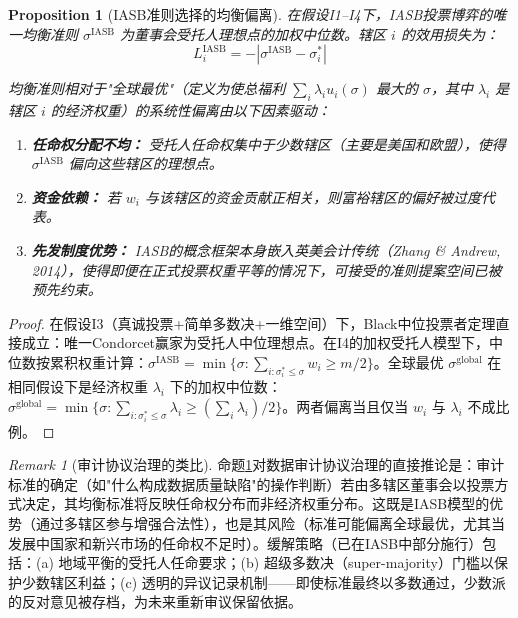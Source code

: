\documentclass[12pt,a4paper]{ctexart}
\newtheorem{proposition}[theorem]{Proposition}
\theoremstyle{definition}
\theoremstyle{remark}
\newtheorem{remark}{Remark}[section]
\begin{document}
\begin{proposition}[IASB准则选择的均衡偏离]
\label{prop:iasb-bias}
在假设I1--I4下，IASB投票博弈的唯一均衡准则 $\sigma^{\text{IASB}}$ 为董事会受托人理想点的加权中位数。辖区 $i$ 的效用损失为：
\begin{equation}
L_i^{\text{IASB}} = -|\sigma^{\text{IASB}} - \sigma_i^*|
\end{equation}

均衡准则相对于"全球最优"（定义为使总福利 $\sum_i \lambda_i u_i(\sigma)$ 最大的 $\sigma$，其中 $\lambda_i$ 是辖区 $i$ 的经济权重）的系统性偏离由以下因素驱动：
\begin{enumerate}[label=(\roman*)]
\item \textbf{任命权分配不均：} 受托人任命权集中于少数辖区（主要是美国和欧盟），使得 $\sigma^{\text{IASB}}$ 偏向这些辖区的理想点。
\item \textbf{资金依赖：} 若 $w_i$ 与该辖区的资金贡献正相关，则富裕辖区的偏好被过度代表。
\item \textbf{先发制度优势：} IASB的概念框架本身嵌入英美会计传统（Zhang \& Andrew, 2014），使得即便在正式投票权重平等的情况下，可接受的准则提案空间已被预先约束。
\end{enumerate}
\end{proposition}

\begin{proof}
在假设I3（真诚投票+简单多数决+一维空间）下，Black中位投票者定理直接成立：唯一Condorcet赢家为受托人中位理想点。在I4的加权受托人模型下，中位数按累积权重计算：$\sigma^{\text{IASB}} = \min\{\sigma : \sum_{i: \sigma_i^* \leq \sigma} w_i \geq m/2\}$。全球最优 $\sigma^{\text{global}}$ 在相同假设下是经济权重 $\lambda_i$ 下的加权中位数：$\sigma^{\text{global}} = \min\{\sigma : \sum_{i: \sigma_i^* \leq \sigma} \lambda_i \geq (\sum_i \lambda_i)/2\}$。两者偏离当且仅当 $w_i$ 与 $\lambda_i$ 不成比例。
\end{proof}

\begin{remark}[审计协议治理的类比]
命题\ref{prop:iasb-bias}对数据审计协议治理的直接推论是：审计标准的确定（如"什么构成数据质量缺陷"的操作判断）若由多辖区董事会以投票方式决定，其均衡标准将反映任命权分布而非经济权重分布。这既是IASB模型的优势（通过多辖区参与增强合法性），也是其风险（标准可能偏离全球最优，尤其当发展中国家和新兴市场的任命权不足时）。缓解策略（已在IASB中部分施行）包括：(a) 地域平衡的受托人任命要求；(b) 超级多数决（super-majority）门槛以保护少数辖区利益；(c) 透明的异议记录机制——即使标准最终以多数通过，少数派的反对意见被存档，为未来重新审议保留依据。
\end{remark}
\end{document}
